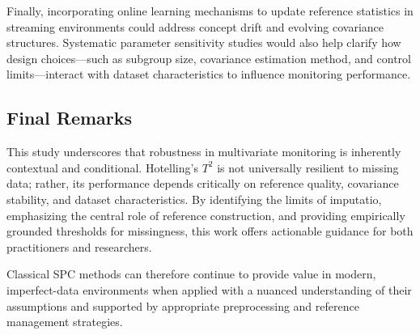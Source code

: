 Finally, incorporating online learning mechanisms to update reference statistics in streaming environments could address concept drift and evolving covariance structures. Systematic parameter sensitivity studies would also help clarify how design choices—such as subgroup size, covariance estimation method, and control limits—interact with dataset characteristics to influence monitoring performance.

\subsection{Final Remarks}

This study underscores that robustness in multivariate monitoring is inherently contextual and conditional. Hotelling’s $T^2$ is not universally resilient to missing data; rather, its performance depends critically on reference quality, covariance stability, and dataset characteristics. By identifying the limits of imputatio, emphasizing the central role of reference construction, and providing empirically grounded thresholds for missingness, this work offers actionable guidance for both practitioners and researchers.

Classical SPC methods can therefore continue to provide value in modern, imperfect-data environments when applied with a nuanced understanding of their assumptions and supported by appropriate preprocessing and reference management strategies.
